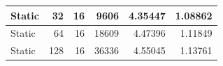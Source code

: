 \documentclass[journal,transmag]{IEEEtran}
\begin{document}
\begin{table}[h]
\begin{tabular}{|l|r|r|r|r|r|}
		Static        & 32                           & 16                           & 9606                              & 4.35447                       & 1.08862                         \\ \hline
		Static        & 64                           & 16                           & 18609                             & 4.47396                       & 1.11849                         \\ \hline
		Static        & 128                          & 16                           & 36336                             & 4.55045                       & 1.13761                         \\ \hline
	\end{tabular}
\end{table}
	\newpage
	
\section{}
\end{document}
